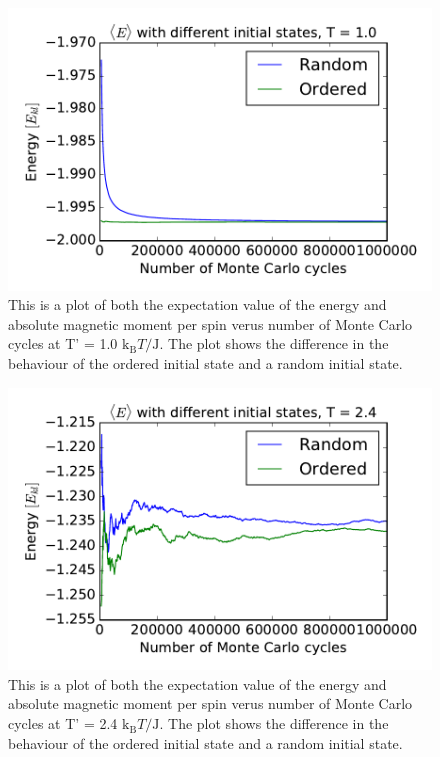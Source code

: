 \begin{figure}[H]
\includegraphics[width=\linewidth]{../results/4c/ran_order_T1}\caption{This is a plot of both the expectation value of the energy and absolute magnetic moment per spin verus number of Monte Carlo cycles at T' = 1.0 $\text{k}_\text{B}T/\text{J}$. The plot shows the difference in the behaviour of the ordered initial state and a random initial state.}\label{fig:L_20_initial_T_1.0}
\end{figure}

\begin{figure}[H]
\includegraphics[width=\linewidth]{../results/4c/ran_order_T2}\caption{This is a plot of both the expectation value of the energy and absolute magnetic moment per spin verus number of Monte Carlo cycles at T' = 2.4 $\text{k}_\text{B}T/\text{J}$. The plot shows the difference in the behaviour of the ordered initial state and a random initial state.}\label{fig:L_20_initial_T_2.4}
\end{figure}

